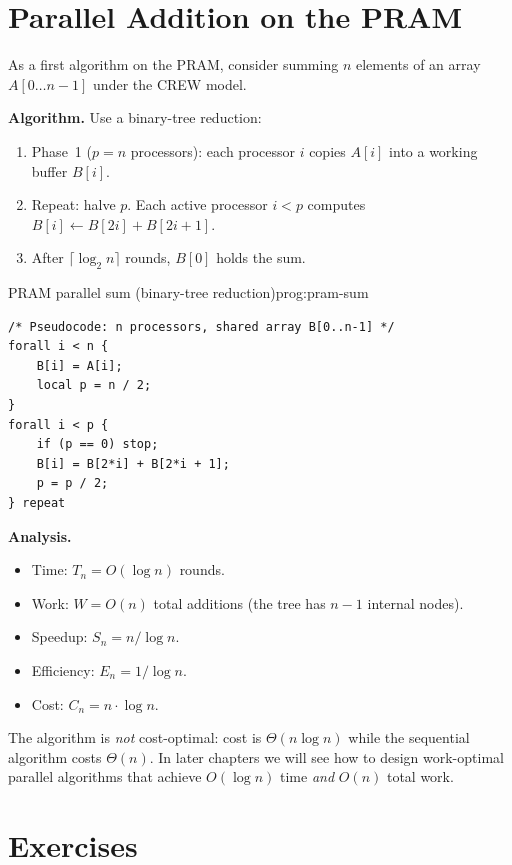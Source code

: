 \section{Parallel Addition on the PRAM}

As a first algorithm on the PRAM, consider summing $n$ elements of an array
$A[0 \ldots n-1]$ under the CREW model.

\textbf{Algorithm.} Use a binary-tree reduction:
\begin{enumerate}
  \item Phase~1 ($p = n$ processors): each processor $i$ copies $A[i]$ into
        a working buffer $B[i]$.
  \item Repeat: halve $p$. Each active processor $i < p$ computes
        $B[i] \leftarrow B[2i] + B[2i+1]$.
  \item After $\lceil \log_2 n \rceil$ rounds, $B[0]$ holds the sum.
\end{enumerate}

\begin{ppprogram}{PRAM parallel sum (binary-tree reduction)}{prog:pram-sum}
\begin{lstlisting}[language={}]
/* Pseudocode: n processors, shared array B[0..n-1] */
forall i < n {
    B[i] = A[i];
    local p = n / 2;
}
forall i < p {
    if (p == 0) stop;
    B[i] = B[2*i] + B[2*i + 1];
    p = p / 2;
} repeat
\end{lstlisting}
\end{ppprogram}

\textbf{Analysis.}
\begin{itemize}
  \item Time: $T_n = O(\log n)$ rounds.
  \item Work: $W = O(n)$ total additions (the tree has $n - 1$ internal nodes).
  \item Speedup: $S_n = n / \log n$.
  \item Efficiency: $E_n = 1 / \log n$.
  \item Cost: $C_n = n \cdot \log n$.
\end{itemize}

\begin{pppitfall}
The algorithm is \emph{not} cost-optimal: cost is $\Theta(n \log n)$ while the
sequential algorithm costs $\Theta(n)$. In later chapters we will see how to
design work-optimal parallel algorithms that achieve $O(\log n)$ time
\emph{and} $O(n)$ total work.
\end{pppitfall}

\section{Exercises}

